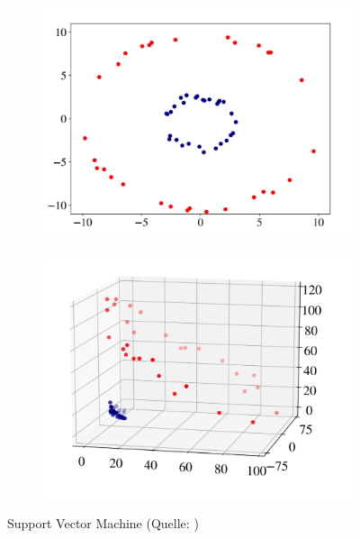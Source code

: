\begin{figure}[H]
\begin{subfigure}[c]{0.5\textwidth}
\includegraphics[width=\textwidth]{Bilder/before_svm.png}
\end{subfigure}
\begin{subfigure}[c]{0.5\textwidth}
\includegraphics[width=\textwidth]{Bilder/SVM.png}
\end{subfigure}

\caption[Support Vector Machine]{Support Vector Machine (Quelle: \cite[vgl.][Kapitel: Fundamental Algorithms, Seite 12-14]{burkov2019hundred})}
    \label{fig: Support Vector Machine}
\end{figure}

